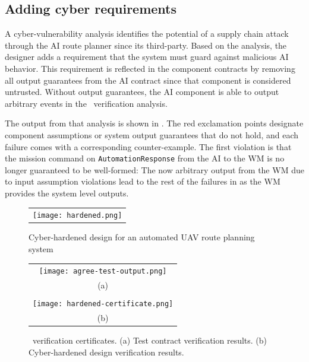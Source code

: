 \subsection{Adding cyber requirements}

%
A cyber-vulnerability analysis identifies the potential of a
supply chain attack through the AI route planner since its third-party.  Based on the analysis, the designer adds a requirement that the system must guard against malicious AI behavior.
This requirement is reflected in the component contracts by removing all output guarantees from the AI contract since that component is considered untrusted.
Without output guarantees, the AI component is able to output arbitrary events in the \agr\ verification analysis.

The output from that analysis is shown in .  The red
exclamation points designate component assumptions or system output
guarantees that do not hold, and each failure comes with a
corresponding counter-example.  The first violation is that the mission command on \texttt{AutomationResponse} from
the AI to the WM is no longer guaranteed to be well-formed: 
The now arbitrary output from the WM due to input assumption violations lead to the rest of the failures
in  as the WM provides the system
level outputs.

\begin{figure}
  \begin{center}
    \begin{tabular}{c}
      \texttt{[image: hardened.png]}
    \end{tabular}
  \end{center}
  \caption{Cyber-hardened design for an automated UAV route planning system}
  \label{fig:hardened}
\end{figure}

\begin{figure}
  \begin{center}
    \begin{tabular}{c}
      \texttt{[image: agree-test-output.png]} \\
      (a) \\ \\
      \texttt{[image: hardened-certificate.png]} \\
      (b)
    \end{tabular}
  \end{center}
  \caption{\agr\ verification certificates. (a) Test contract verification results. (b) Cyber-hardened design verification results.}
  \label{fig:hardened-certificate}
\end{figure}

